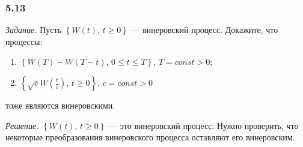 \subsubsection*{5.13}

\textit{Задание.}
Пусть $ \left\{ W \left( t \right), \, t \geq 0 \right\} $ --- винеровский процесс.
Докажите, что процессы:
\begin{enumerate}[label=\alph*)]
  \item $ \left\{ W \left( T \right) - W \left( T - t \right), \, 0 \leq t \leq T \right\}, \,
    T = const > 0$;
  \item $ \left\{ \sqrt{c} W \left( \frac{t}{c} \right), \, t \geq 0 \right\}, \,
    c = const > 0$
\end{enumerate}
тоже являются винеровскими.

\textit{Решение.}
$ \left\{ W \left( t \right), \, t \geq 0 \right\} $ --- это винеровский процесс.
Нужно проверить, что некоторые преобразования винеровского процесса оставляют его винеровским.
